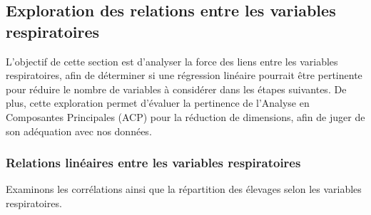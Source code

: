 \documentclass{article}
\begin{document}
\subsection{Exploration des relations entre les variables respiratoires}
L'objectif de cette section est d'analyser la force des liens entre les variables respiratoires, afin de déterminer si une régression linéaire pourrait être pertinente pour réduire le nombre de variables à considérer dans les étapes suivantes. De plus, cette exploration permet d'évaluer la pertinence de l'Analyse en Composantes Principales (ACP) pour la réduction de dimensions, afin de juger de son adéquation avec nos données.

\subsubsection{Relations linéaires entre les variables respiratoires}
Examinons les corrélations ainsi que la répartition des élevages selon les variables respiratoires.
\end{document}
